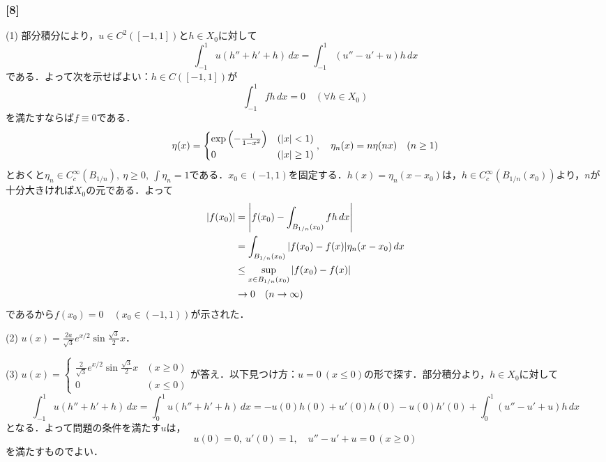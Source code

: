 \documentclass[a4j]{ltjsarticle}
\newcommand{\1}{\mathbbm{1}}
\numberwithin{equation}{section}
\theoremstyle{definition}
\begin{document}
\subsubsection*{[8]}
(1) 部分積分により，$u\in C^2([-1,1])$と$h\in X_0$に対して
\begin{equation}
    \int_{-1}^{1} u(h''+h'+h)\,dx=\int_{-1}^{1} (u''-u'+u)h\,dx 
\end{equation}
である．よって次を示せばよい：$h\in C([-1,1])$が
\begin{equation}
    \int_{-1}^{1}fh\,dx=0 \quad (\forall h\in X_0)
\end{equation}
を満たすならば$f\equiv 0$である．
\begin{equation}
    \eta(x)=\begin{cases}
        \exp\qty(-\frac{1}{1-x^2}) & (\abs{x}<1) \\
        0 & (\abs{x}\geq 1)
    \end{cases},\quad \eta_n(x)=n\eta(nx)\quad (n\geq 1)
\end{equation}
とおくと$\eta_n\in C_c^\infty(B_{1/n}),\ \eta\geq0,\ \int \eta_n=1$である．$x_0\in(-1,1)$を固定する．$h(x)=\eta_n(x-x_0)$は，$h\in C_c^\infty(B_{1/n}(x_0))$より，$n$が十分大きければ$X_0$の元である．よって
\begin{align}
    \abs{f(x_0)}&=\abs{f(x_0)-\int_{B_{1/n}(x_0)}fh\,dx}\\
    &=\int_{B_{1/n}(x_0)}\abs{f(x_0)-f(x)}\eta_n(x-x_0)\,dx\\
    &\leq \sup_{x\in B_{1/n}(x_0)}\abs{f(x_0)-f(x)}\\
    &\to 0\quad (n\to\infty )
\end{align}
であるから$f(x_0)=0\quad (x_0\in(-1,1))$が示された．

(2) $u(x)=\frac{2a}{\sqrt{3}}e^{x/2}\sin\frac{\sqrt{3}}{2}x$．

(3) $u(x)=\begin{cases}
    \frac{2}{\sqrt{3}}e^{x/2}\sin \frac{\sqrt{3}}{2}x & (x\geq 0)\\
    0 & (x\leq 0)
\end{cases}$が答え．以下見つけ方：$u=0\ (x\leq 0)$の形で探す．部分積分より，$h\in X_0$に対して
\begin{equation}
    \int_{-1}^{1}u(h''+h'+h)\,dx=\int_{0}^{1}u(h''+h'+h)\,dx=-u(0)h(0)+u'(0)h(0)-u(0)h'(0)+\int_{0}^{1}(u''-u'+u)h\,dx 
\end{equation}
となる．よって問題の条件を満たす$u$は，
\begin{equation}
    u(0)=0,\ u'(0)=1,\quad u''-u'+u=0\ (x\geq0)
\end{equation}
を満たすものでよい．
\end{document}
